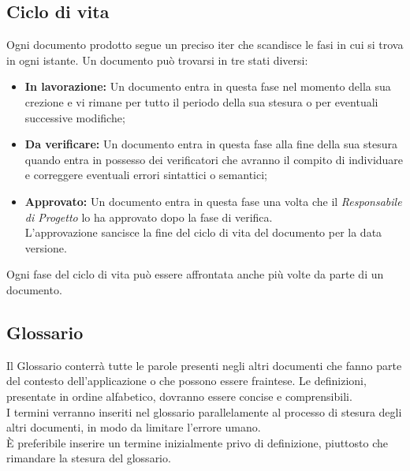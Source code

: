     \subsection{Ciclo di vita}\label{subsec:ciclovita}
      Ogni documento prodotto segue un preciso iter che scandisce le fasi in cui si trova in ogni istante. Un documento può trovarsi in tre stati diversi:\\
      \begin{itemize}
        \item \textbf{In lavorazione: }Un documento entra in questa fase nel momento della sua crezione e vi rimane per tutto il periodo della sua stesura
          o per eventuali successive modifiche;
        \item \textbf{Da verificare: }Un documento entra in questa fase alla fine della sua stesura quando entra in possesso dei verificatori che avranno il compito
          di individuare e correggere eventuali errori sintattici o semantici;
        \item \textbf{Approvato: }Un documento entra in questa fase una volta che il \emph{Responsabile di Progetto} lo ha approvato dopo la fase di verifica.\\
          L'approvazione sancisce la fine del ciclo di vita del documento per la data versione.
      \end{itemize}
      Ogni fase del ciclo di vita può essere affrontata anche più volte da parte di un documento.
\subsection{Glossario}
  Il Glossario conterrà tutte le parole presenti negli altri documenti che fanno parte del contesto dell’applicazione o che possono essere fraintese. Le definizioni, presentate in
  ordine alfabetico, dovranno essere concise e comprensibili.\\
  I termini verranno inseriti nel glossario parallelamente al processo di stesura degli altri documenti, in modo da limitare l’errore umano.\\
  È preferibile inserire un termine inizialmente privo di definizione, piuttosto che rimandare la stesura del glossario.
